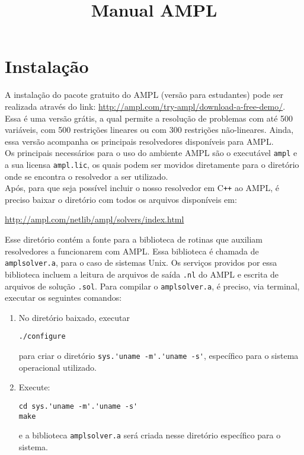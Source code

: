 \documentclass{article}
\title{Manual AMPL}
\date{ }
\begin{document}
\maketitle

\section{Instalação}
A instalação do pacote gratuito do AMPL (versão para estudantes) pode ser realizada através do link: \url{http://ampl.com/try-ampl/download-a-free-demo/}.\\

Essa é uma versão grátis, a qual permite a resolução de problemas com até 500 variáveis, com 500 restrições lineares ou com 300 restrições não-lineares. Ainda, essa versão acompanha os principais resolvedores disponíveis para AMPL.\\

Os principais necessários para o uso do ambiente AMPL são o executável \verb|ampl| e a sua licensa \verb|ampl.lic|, os quais podem ser movidos diretamente para o diretório onde se encontra o resolvedor a ser utilizado.\\

Após, para que seja possível incluir o nosso resolvedor em C\verb|++| ao AMPL, é preciso baixar o diretório com todos os arquivos disponíveis em: 
\begin{center}
\url{http://ampl.com/netlib/ampl/solvers/index.html}
\end{center}
Esse diretório contém a fonte para a biblioteca de rotinas que auxiliam resolvedores a funcionarem com AMPL. Essa biblioteca é chamada de \verb|amplsolver.a|, para o caso de sistemas Unix. Os serviços providos por essa biblioteca incluem a leitura de arquivos de saída \verb|.nl| do AMPL e escrita de arquivos de solução \verb|.sol|. Para compilar o \verb|amplsolver.a|, é preciso, via terminal, executar os seguintes comandos:
\begin{enumerate}
\item No diretório baixado, executar
\begin{verbatim}
./configure
\end{verbatim}
para criar o diretório \verb|sys.'uname -m'.'uname -s'|, específico para o sistema operacional utilizado. 
\item Execute:
\begin{verbatim}
cd sys.'uname -m'.'uname -s'
make
\end{verbatim}
e a biblioteca \verb|amplsolver.a| será criada nesse diretório específico para o sistema.
\end{enumerate} 
\end{document}
